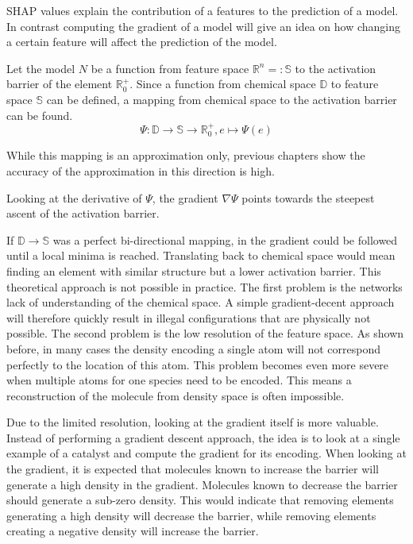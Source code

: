 SHAP values explain the contribution of a features to the prediction of a model.
In contrast computing the gradient of a model will give an idea on how changing a certain feature will affect the prediction of the model.

Let the model $N$ be a function from feature space $\mathbb{R}^n =: \mathbb{S}$ to the activation barrier of the element $\mathbb{R}^+_0$.
Since a function from chemical space $\mathbb{D}$ to feature space $\mathbb{S}$ can be defined,
a mapping from chemical space to the activation barrier can be found.
$$ \Psi : \mathbb{D} \to \mathbb{S} \to \mathbb{R}^+_0, e \mapsto \Psi(e) $$

While this mapping is an approximation only, previous chapters show
the accuracy of the approximation in this direction is high.

Looking at the derivative of $\Psi$, the gradient $\nabla \Psi$ points towards the steepest ascent of the activation barrier.

If $\mathbb{D} \to \mathbb{S}$ was a perfect bi-directional mapping, in the gradient could be followed until a local minima is reached.
Translating back to chemical space would mean finding an element with similar structure but a lower activation barrier.
This theoretical approach is not possible in practice.
The first problem is the networks lack of understanding of the chemical space.
A simple gradient-decent approach will therefore quickly result in illegal configurations 
that are physically not possible.
The second problem is the low resolution of the feature space.
As shown before, in many cases the density encoding a single atom will not correspond perfectly to the location of this atom.
This problem becomes even more severe when multiple atoms for one species need to be encoded.
This means a reconstruction of the molecule from density space is often impossible.

Due to the limited resolution, looking at the gradient itself is more valuable.
Instead of performing a gradient descent approach, the idea is to look at a single example of a catalyst and compute the gradient for its encoding.
When looking at the gradient, it is expected that molecules known to increase the barrier will generate a high density in the gradient.
Molecules known to decrease the barrier should generate a sub-zero density.
This would indicate that removing elements generating a high density will decrease the barrier,
while removing elements creating a negative density will increase the barrier. %

